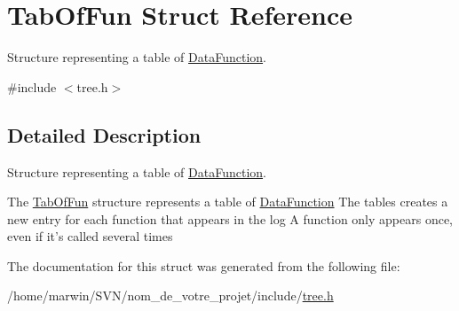 \hypertarget{struct_tab_of_fun}{\section{Tab\-Of\-Fun Struct Reference}
\label{struct_tab_of_fun}
}


Structure representing a table of \hyperlink{struct_data_function}{Data\-Function}.  




{\ttfamily \#include $<$tree.\-h$>$}



\subsection{Detailed Description}
Structure representing a table of \hyperlink{struct_data_function}{Data\-Function}. 

The \hyperlink{struct_tab_of_fun}{Tab\-Of\-Fun} structure represents a table of \hyperlink{struct_data_function}{Data\-Function} The tables creates a new entry for each function that appears in the log A function only appears once, even if it's called several times 

The documentation for this struct was generated from the following file\-:\begin{DoxyCompactItemize}
\item 
/home/marwin/\-S\-V\-N/nom\-\_\-de\-\_\-votre\-\_\-projet/include/\hyperlink{tree_8h}{tree.\-h}\end{DoxyCompactItemize}
